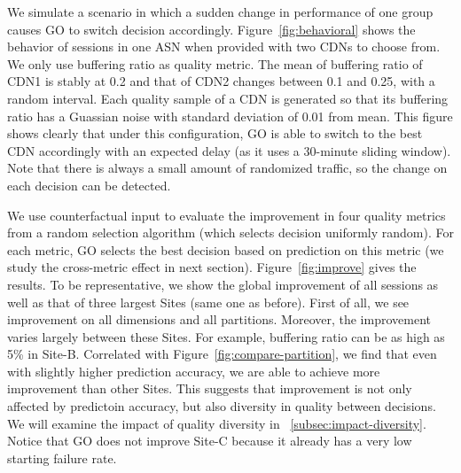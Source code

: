  We simulate a scenario in which a sudden change in performance of one group causes GO to switch decision accordingly. Figure~\ref{fig:behavioral} shows the behavior of sessions in one ASN when provided with two CDNs to choose from. We only use buffering ratio as quality metric. The mean of buffering ratio of CDN1 is stably at 0.2 and that of CDN2 changes between 0.1 and 0.25, with a random interval. Each quality sample of a CDN is generated so that its buffering ratio has a Guassian noise with standard deviation of 0.01 from mean. This figure shows clearly that under this configuration, GO is able to switch to the best CDN accordingly with an expected delay (as it uses a 30-minute sliding window). Note that there is always a small amount of randomized traffic, so the change on each decision can be detected. %




\label{subsec:go-improve}
We use counterfactual input to evaluate the improvement in four quality metrics from a random selection algorithm (which selects decision uniformly random). For each metric, GO selects the best decision based on prediction on this metric (we study the cross-metric effect in next section). Figure~\ref{fig:improve} gives the results. To be representative, we show the global improvement of all sessions as well as that of three largest Sites (same one as before). First of all, we see improvement on all dimensions and all partitions. Moreover, the improvement varies largely between these Sites. For example, buffering ratio can be as high as 5\% in Site-B. Correlated with Figure~\ref{fig:compare-partition}, we find that even with slightly higher prediction accuracy, we are able to achieve more improvement than other Sites. This suggests that improvement is not only affected by predictoin accuracy, but also diversity in quality between decisions. We will examine the impact of quality diversity in \Section~\ref{subsec:impact-diversity}.
Notice that GO does not improve Site-C because it already has a very low starting failure rate.



